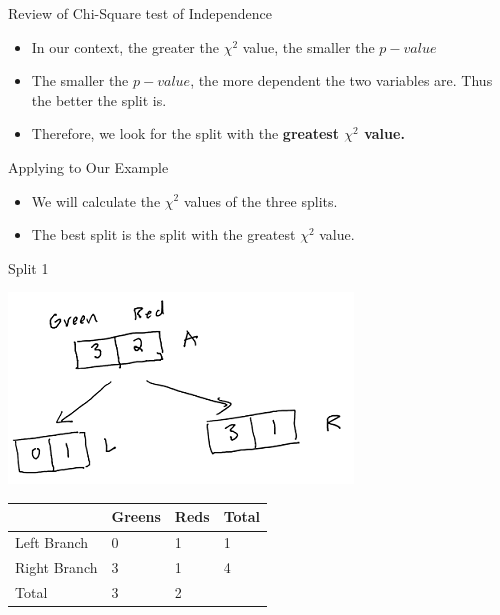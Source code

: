\documentclass[
  ignorenonframetext,
]{beamer}
\providecommand{\tightlist}{%
  \setlength{\itemsep}{0pt}\setlength{\parskip}{0pt}}
\begin{document}
\begin{frame}{Review of Chi-Square test of Independence}
\protect\hypertarget{review-of-chi-square-test-of-independence-1}{}

\begin{itemize}
\tightlist
\item
  In our context, the greater the \(\chi^2\) value, the smaller the
  \(p-value\)
\item
  The smaller the \(p-value\), the more dependent the two variables are.
  Thus the better the split is.
\item
  Therefore, we look for the split with the \textbf{greatest \(\chi^2\)
  value.}
\end{itemize}

\end{frame}

\begin{frame}{Applying to Our Example}
\protect\hypertarget{applying-to-our-example}{}

\begin{itemize}
\tightlist
\item
  We will calculate the \(\chi^2\) values of the three splits.\\
\item
  The best split is the split with the greatest \(\chi^2\) value.
\end{itemize}

\end{frame}

\begin{frame}{Split 1}
\protect\hypertarget{split-1}{}

\includegraphics{images2/im1.png}

\begin{longtable}[]{@{}llll@{}}
\toprule
& Greens & Reds & Total\tabularnewline
\midrule
\endhead
Left Branch & 0 & 1 & 1\tabularnewline
Right Branch & 3 & 1 & 4\tabularnewline
Total & 3 & 2 &\tabularnewline
\bottomrule
\end{longtable}

\end{frame}
\end{document}
